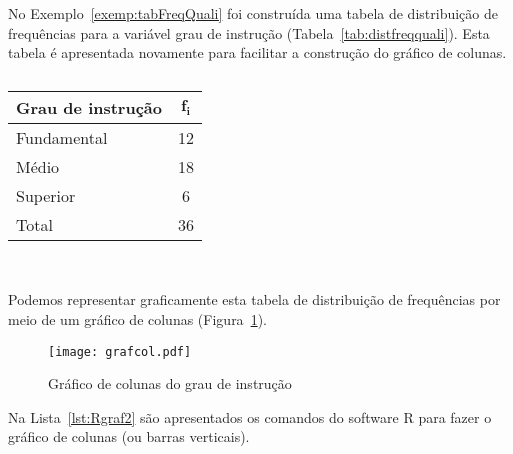 \documentclass[11pt,fleqn]{book} %
\begin{document}
\begin{example} \label{exemp:grafcol} 

No Exemplo~\ref{exemp:tabFreqQuali} foi construída uma tabela de distribuição de frequências para a variável grau de instrução (Tabela~\ref{tab:distfreqquali}). Esta tabela é apresentada novamente para facilitar a construção do gráfico de colunas.


\begin{table}[h]
	\begin{rBox}
	\captionsetup{labelformat=empty}
	\caption{}
	\centering
	{\color{olivine!130} \begin{tabular}{l c}
	\toprule
	\textbf{Grau de instrução} & $\bm{f_i}$\\
	\midrule
	Fundamental & 12 \\
	Médio & 18 \\
	Superior & 6 \\
	\hline
	Total & 36 \\
	\bottomrule
	\end{tabular}} \\
	\end{rBox}
\end{table}


Podemos representar graficamente esta tabela de distribuição de frequências por meio de um gráfico de colunas (Figura~\ref{fig:grafcol}).

\begin{figure}[h!]
\centering\texttt{[image: grafcol.pdf]}
\setlength{\abovecaptionskip}{0.5pt}
\caption{Gráfico de colunas do grau de instrução}
\label{fig:grafcol} %
\end{figure}

\end{example}


Na Lista~\ref{lst:Rgraf2} são apresentados os comandos do software R para fazer o gráfico de colunas (ou barras verticais).  \\
\end{document}
